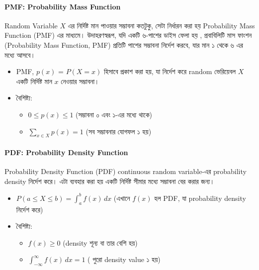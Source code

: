 \documentclass[graybox, envcountchap, twocolumn]{styles/svmult}
\begin{document}
\paragraph{PMF: Probability Mass Function}
{\bengalifont
Random Variable $X$ এর নির্দিষ্ট মান পাওয়ার সম্ভাবনা কতটুকু, সেটা নির্ধারন করা হয় Probability Mass Function (PMF) এর মাধ্যমে। উদাহরণস্বরূপ,  যদি একটি ৬-পাশের ডাইস ফেলা হয় , প্রবাবিলিটি মাস ফাংশন (Probability Mass Function, PMF) প্রতিটি পাশের সম্ভাবনা নির্দেশ করবে, যার মান ১ থেকে ৬ এর মধ্যে আসবে।
}
\begin{itemize}
    \item PMF,  $p(x)$ = $P(X=x)$ {\bengalifont হিসাবে প্রকাশ করা হয়, যা নির্দেশ করে random ভেরিয়েবল} $X$ {\bengalifont একটি নির্দিষ্ট মান } $x$ {\bengalifont নেওয়ার সম্ভাবনা। }
    \item {\bengalifont বৈশিষ্ট্য:}
    \begin{itemize}
        \item $0 ≤ p(x) ≤ 1$ {\bengalifont (সম্ভাবনা ০ এবং ১-এর মধ্যে থাকে)}
        \item $\sum_{x \in X} p(x) = 1$ {\bengalifont (সব সম্ভাবনার যোগফল ১ হয়)}
    \end{itemize}
\end{itemize}


\paragraph{PDF: Probability Density Function}

{\bengalifont Probability Density Function (PDF) continuous random variable-এর probability density নির্দেশ করে। এটা ব্যবহার করা হয় একটি নির্দিষ্ট সীমার মধ্যে সম্ভাবনা বের করার জন্য। }

\begin{itemize}
    \item $P(a \leq X \leq b) = \int_{a}^{b} f(x) \, dx$ {\bengalifont (এখানে $f(x)$ হল PDF, যা probability density নির্দেশ করে)}
    \item {\bengalifont বৈশিষ্ট্য:}
    \begin{itemize}
        \item $f(x) \geq 0$ {\bengalifont (density  শূন্য বা তার বেশি হয়)}
        \item $\int_{-\infty}^{\infty} f(x) \, dx = 1$ {\bengalifont ( পুরো density value ১ হয়)}
    \end{itemize}
\end{itemize}
\end{document}
